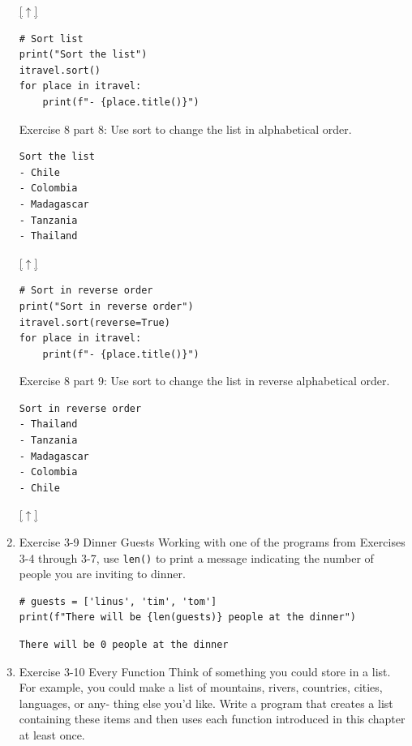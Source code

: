 \documentclass[10pt]{book}
\newenvironment{code}{\captionsetup{labelfont=bf, type=listing, name=Snippet, aboveskip=-3pt ,belowskip=15pt}}{}
\begin{document}
\begin{enumerate}
\hyperref[sec:orge5f6a28]{{[}\(\uparrow\)]​}

\label{org0ab3fb5}
\begin{code}
\begin{verbatim}
# Sort list
print("Sort the list")
itravel.sort()
for place in itravel:
    print(f"- {place.title()}")
\end{verbatim}
\caption{\label{lst:org344a067}Exercise 8 part 8: Use sort to change the list in alphabetical order.}
\end{code}

\label{org4487f67}
\begin{verbatim}
Sort the list
- Chile
- Colombia
- Madagascar
- Tanzania
- Thailand
\end{verbatim}

\hyperref[sec:orge5f6a28]{{[}\(\uparrow\)]​}

\label{org7201b8b}
\begin{code}
\begin{verbatim}
# Sort in reverse order
print("Sort in reverse order")
itravel.sort(reverse=True)
for place in itravel:
    print(f"- {place.title()}")
\end{verbatim}
\caption{\label{lst:orge86fca7}Exercise 8 part 9: Use sort to change the list in reverse alphabetical order.}
\end{code}

\label{org3fe4924}
\begin{verbatim}
Sort in reverse order
- Thailand
- Tanzania
- Madagascar
- Colombia
- Chile
\end{verbatim}

\hyperref[sec:orge5f6a28]{{[}\(\uparrow\)]​}
\item Exercise 3-9 Dinner Guests
\label{sec:org6ec27e3}
Working with one of the programs from Exercises 3-4 through 3-7, use \texttt{len()} to print a message indicating the number of people you are inviting to dinner.
\begin{verbatim}
# guests = ['linus', 'tim', 'tom']
print(f"There will be {len(guests)} people at the dinner")
\end{verbatim}

\label{orgd7ca50c}
\begin{verbatim}
There will be 0 people at the dinner
\end{verbatim}
\item Exercise 3-10 Every Function
\label{sec:org19aaedb}
Think of something you could store in a list. For example, you could make a list of mountains, rivers, countries, cities, languages, or any- thing else you’d like. Write a program that creates a list containing these items and then uses each function introduced in this chapter at least once.


\end{enumerate}
\end{document}
